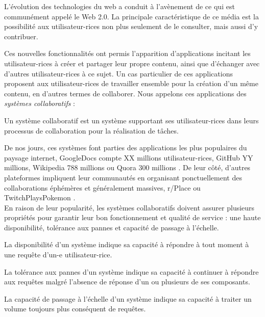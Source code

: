 \label{sec:intro-contexte}

L'évolution des technologies du web a conduit à l'avènement de ce qui est communément appelé le Web 2.0.
La principale caractéristique de ce média est la possibilité aux utilisateur-rices non plus seulement de le consulter, mais aussi d'y contribuer.

Ces nouvelles fonctionnalités ont permis l'apparition d'applications incitant les utilisateur-rices à créer et partager leur propre contenu, ainsi que d'échanger avec d'autres utilisateur-rices à ce sujet.
Un cas particulier de ces applications proposent aux utilisateur-rices de travailler ensemble pour la création d'un même contenu, en d'autres termes de collaborer.
Nous appelons ces applications des \emph{systèmes collaboratifs} :
\begin{definition}
  \label{def:collaborative-system}
  Un système collaboratif est un système supportant ses utilisateur-rices dans leurs processus de collaboration pour la réalisation de tâches.
\end{definition}

De nos jours, ces systèmes font parties des applications les plus populaires du paysage internet, \eg GoogleDocs compte XX millions utilisateur-rices, GitHub YY millions, Wikipedia 788 millions {\cite{2022-09-monthly-active-users-wikipedia}} ou Quora 300 millions \cite{2022-01-monthly-active-users-social-networks}.
De leur côté, d'autres plateformes impliquent leur communautés en organisant ponctuellement des collaborations éphémères et généralement massives, \eg r/Place \cite{2022-rplace} ou TwitchPlaysPokemon \cite{2014-twitch-plays-pokemon}.\\

En raison de leur popularité, les systèmes collaboratifs doivent assurer plusieurs propriétés pour garantir leur bon fonctionnement et qualité de service : une haute disponibilité, tolérance aux pannes et capacité de passage à l'échelle.
\begin{definition}[Disponibilité]
  \label{def:availability}
  La disponibilité d'un système indique sa capacité à répondre à tout moment à une requête d'un-e utilisateur-rice.
\end{definition}
\begin{definition}
  La tolérance aux pannes d'un système indique sa capacité à continuer à répondre aux requêtes malgré l'absence de réponse d'un ou plusieurs de ses composants.
\end{definition}
\begin{definition}
  La capacité de passage à l'échelle d'un système indique sa capacité à traiter un volume toujours plus conséquent de requêtes.
\end{definition}

